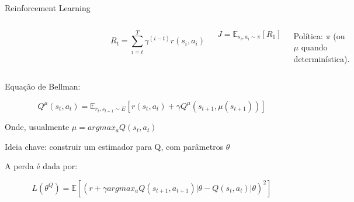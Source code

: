 \documentclass[pdf]{beamer}
\begin{document}
\begin{frame}{Reinforcement Learning}
\begin{columns}
\begin{figure}
	\begin{subfigure}[t]{\textwidth}
		\includegraphics[scale=.5]{img/esquema_rl.png}
	\end{subfigure}

\end{figure}
	$$ 
	R_t = \sum_{i=t}^{T}{\gamma^{(i-t)}r(s_i, a_i)} 
	$$
	
	$$
	J = \mathbb{E}_{s_i, a_i \sim \pi}[R_1]
	$$
	
	Política: $\pi$ (ou $\mu$ quando determinística).

\end{columns}	
	Equação de Bellman:
	
	$$
	 Q^\mu(s_t, a_t) =  \mathbb{E}_{r_t, s_{t+1}\sim E}[r(s_t, a_t) + \gamma Q^\mu(s_{t+1}, \mu(s_{t+1}))]
	 $$
	
	Onde, usualmente $\mu = argmax_aQ(s_t, a_t)$
	
	Ideia chave: construir um estimador para Q, com parâmetros $\theta$
	
	A perda é dada por:
	
	$$ 
	L(\theta^Q) = \mathbb{E} [(r + \gamma argmax_aQ(s_{t+1}, a_{t+1})|\theta -  Q(s_{t}, a_{t})|\theta )^2] 
	$$	
	

\end{frame}
\end{document}
